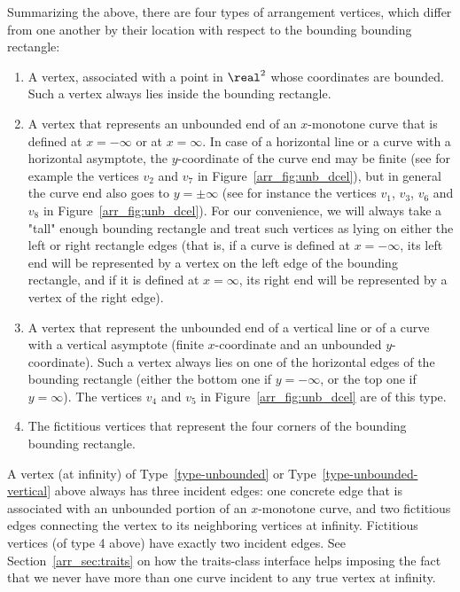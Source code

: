 \begin{ccAdvanced}
Summarizing the above, there are four types of arrangement vertices,
which differ from one another by their location with respect to the
bounding bounding rectangle:
\begin{enumerate}
\item\label{type-normal}
  A vertex, associated with a point in $\real^2$ whose
  coordinates are bounded. Such a vertex always lies inside the
  bounding rectangle.
\item\label{type-unbounded}
  A vertex that represents an unbounded end of an $x$-monotone curve
  that is defined at $x = -\infty$ or at $x = \infty$. In case of
  a horizontal line or a curve with a horizontal asymptote, the
  $y$-coordinate of the curve end may be finite (see for example the
  vertices $v_2$ and $v_7$ in Figure~\ref{arr_fig:unb_dcel}), but in
  general the curve end also goes to $y = \pm\infty$ (see for instance
  the vertices $v_1$, $v_3$, $v_6$ and $v_8$ in
  Figure~\ref{arr_fig:unb_dcel}). For our convenience, we will always
  take a "tall" enough bounding rectangle and treat such vertices as
  lying on either the left or right rectangle edges (that is, if a curve
  is defined at $x = -\infty$, its left end will be represented by
  a vertex on the left edge of the bounding rectangle, and if it is
  defined at $x = \infty$, its right end will be represented by a
  vertex of the right edge).
\item\label{type-unbounded-vertical}
  A vertex that represent the unbounded end of a vertical line or of a
  curve with a vertical asymptote (finite $x$-coordinate and an
  unbounded $y$-coordinate). Such a vertex always lies on one of the
  horizontal edges of the bounding rectangle (either the bottom one if
  $y = -\infty$, or the top one if $y = \infty$). The vertices $v_4$ 
  and $v_5$ in Figure~\ref{arr_fig:unb_dcel} are of this type.
\item\label{type-fictitious}
  The fictitious vertices that represent the four corners of the
  bounding bounding rectangle.
\end{enumerate}
A vertex (at infinity) of Type~\ref{type-unbounded} or
Type~\ref{type-unbounded-vertical} above always has
three incident edges: one concrete edge that is associated with an
unbounded portion of an $x$-monotone curve, and two fictitious edges
connecting the vertex to its neighboring vertices at infinity.
Fictitious vertices (of type 4 above) have exactly two incident edges.
See Section~\ref{arr_sec:traits} on how the traits-class interface
helps imposing the fact that we never have more than one curve
incident to any true vertex at infinity.


\end{ccAdvanced}
